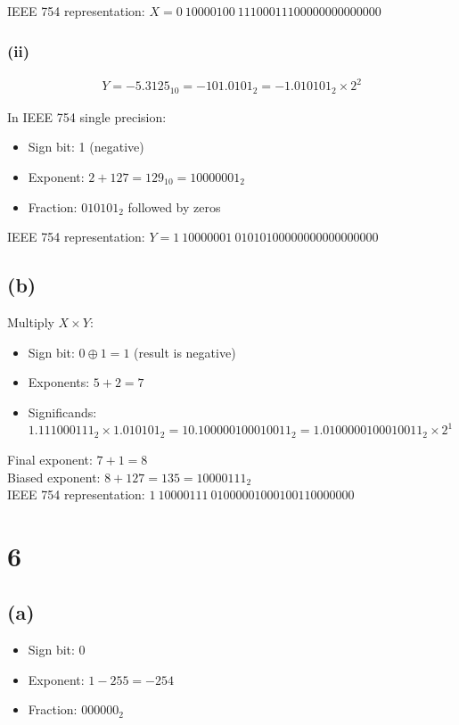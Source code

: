 \documentclass[12pt]{article}
\begin{document}
IEEE 754 representation: $X = 0\ 10000100\ 11100011100000000000000$

\subsubsection*{(ii)}

\begin{align*}
Y = -5.3125_{10} = -101.0101_2 = -1.010101_2 \times 2^2
\end{align*}

In IEEE 754 single precision:
\begin{itemize}
    \item Sign bit: 1 (negative)
    \item Exponent: $2 + 127 = 129_{10} = 10000001_2$
    \item Fraction: $010101_2$ followed by zeros
\end{itemize}

IEEE 754 representation: $Y = 1\ 10000001\ 01010100000000000000000$

\subsection*{(b)}

Multiply $X \times Y$:

\begin{itemize}
     \item Sign bit: $0 \oplus 1 = 1$ (result is negative)
     \item Exponents: $5 + 2 = 7$
     \item Significands: $1.111000111_2 \times 1.010101_2 = 10.100000100010011_2 = 1.0100000100010011_2 \times 2^1$
\end{itemize}

Final exponent: $7 + 1 = 8$ \\
Biased exponent: $8 + 127 = 135 = 10000111_2$ \\
IEEE 754 representation: $1\ 10000111\ 01000001000100110000000$

\section*{6}

\subsection*{(a)}

\begin{itemize}
    \item Sign bit: 0
    \item Exponent: $1 - 255 = -254$
    \item Fraction: $000000_2$
\end{itemize}
\end{document}
